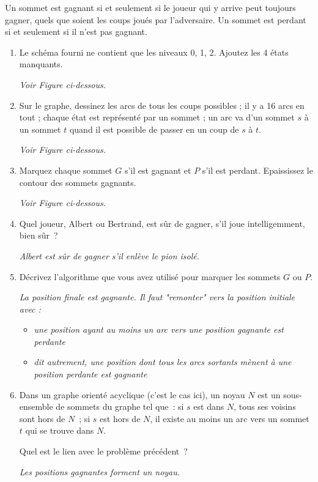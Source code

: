 \documentclass[11pt]{article}
\begin{document}
\medskip
Un sommet est gagnant si et seulement si le joueur qui y arrive peut toujours gagner, quels que soient les coups joués par l'adversaire.
Un sommet est perdant si et seulement si il n'est pas gagnant.


 \begin{enumerate}
\item  Le schéma fourni ne contient que les niveaux 0, 1, 2. Ajoutez les 4 états
manquants.

\emph{Voir Figure ci-dessous.}

\item  Sur le graphe, dessinez les arcs de tous les coups possibles ; il y a 16
arcs en tout ; chaque état est représenté par un sommet ; un arc va d’un
sommet $s$ à un sommet $t$ quand il est possible de passer en un coup de
$s$ à $t$.


\emph{Voir Figure ci-dessous.}


\item Marquez chaque sommet $G$ s’il est gagnant et $P$ s’il est perdant. Epaississez le contour des sommets gagnants.


\emph{Voir Figure ci-dessous.}


\item  Quel joueur, Albert ou Bertrand, est sûr de gagner, s'il joue intelligemment, bien sûr~?

\emph{Albert est sûr de gagner s'il enlève le pion isolé. }

\item Décrivez l'algorithme que vous avez utilisé pour marquer les sommets  $G$ ou $P$.

\emph{La position finale est gagnante. Il faut "remonter" vers la position initiale avec :}
\begin{itemize}
\item \emph{une position ayant au moins un arc  vers une position gagnante est perdante}
\item \emph{dit autrement, une position dont tous les arcs sortants mènent à une position perdante est gagnante}
\end{itemize}

\item  Dans un graphe orienté acyclique (c'est le cas ici), un noyau $N$ est 
un sous-ensemble de sommets du graphe tel que~: si $s$ est dans $N$, tous ses voisins sont hors de $N$~; si $s$ est hors de $N$, il existe au moins un arc vers un sommet $t$ qui se trouve dans $N$. 

Quel est le lien avec le problème précédent~? 

\emph{Les positions gagnantes forment un noyau.}

\end{enumerate}
\end{document}
